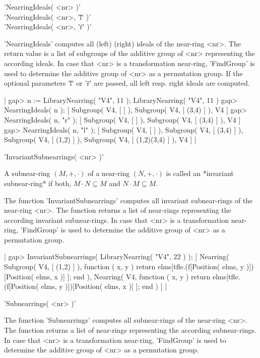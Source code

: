'NearringIdeals( <nr> )' \\
'NearringIdeals( <nr>, '\"l\"' )' \\
'NearringIdeals( <nr>, '\"r\"' )' 

'NearringIdeals'  computes all (left) (right) ideals of the near-ring 
<nr>. The return value is a list of subgroups 
of the additive group of <nr> representing the according ideals.
In case that <nr> is a transformation near-ring, 'FindGroup' is used 
to determine the additive group of <nr> as a permutation group.
If the optional parameters '\"l\"' or '\"r\"' are passed, all left
resp. right ideals are computed.

|  gap> n := LibraryNearring( "V4", 11 );
  LibraryNearring( "V4", 11 )
  gap> NearringIdeals( n );
  [ Subgroup( V4, [  ] ), Subgroup( V4, [ (3,4) ] ), V4 ]
  gap> NearringIdeals( n, "r" );
  [ Subgroup( V4, [  ] ), Subgroup( V4, [ (3,4) ] ), V4 ]
  gap> NearringIdeals( n, "l" );
  [ Subgroup( V4, [  ] ), Subgroup( V4, [ (3,4) ] ), 
    Subgroup( V4, [ (1,2) ] ), Subgroup( V4, [ (1,2)(3,4) ] ), V4 ]
|

   
'InvariantSubnearrings( <nr> )'  

A subnear-ring $(M,+,\cdot)$ of a near-ring $(N,+,\cdot)$ is called an 
*invariant subnear-ring* if both, $M \cdot N \subseteq M$ and
$N \cdot M \subseteq M$.

The function 'InvariantSubnearrings'  computes all invariant 
subnear-rings of the near-ring <nr>.
The function returns a list of near-rings representing the according 
invariant subnear-rings.
In case that <nr> is a transformation near-ring, 'FindGroup' is used 
to determine the additive group of <nr> as a permutation group.

|  gap> InvariantSubnearrings( LibraryNearring( "V4", 22 ) );
  [ Nearring( Subgroup( V4, [ (1,2) ] ), function ( x, y )
          return elms[tfle.(f[Position( elms, y )])[Position( elms, x )]
             ];
      end ), Nearring( V4, function ( x, y )
          return elms[tfle.(f[Position( elms, y )])[Position( elms, x )]
             ];
      end ) ]
|

   
'Subnearrings( <nr> )'  

The function 'Subnearrings'  computes all subnear-rings of the near-ring 
<nr>. The function returns a list of near-rings representing the 
according subnear-rings.
In case that <nr> is a transformation near-ring, 'FindGroup' is used 
to determine the additive group of <nr> as a permutation group.

